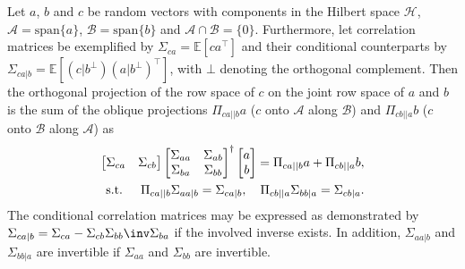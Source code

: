 \begin{lem}\label{lem:oblique_projections}\citep[Lemma~1]{Katayama1999} %
Let $a$, $b$ and $c$ be random vectors with components in the Hilbert space $\mathscr{H}$, $\mathscr{A}=\text{span}\{a\}$, $\mathscr{B}=\text{span}\{b\}$ and $\mathscr{A}\cap\mathscr{B}=\{0\}$. Furthermore, let correlation matrices be exemplified by $\Sigma_{ca}=\mathbb{E}[ca^\top]$ and their conditional counterparts by $\Sigma_{ca|b}=\mathbb{E}[(c|b^\bot)(a|b^\bot)^\top]$, with $\bot$ denoting the orthogonal complement. Then the orthogonal projection of the row space of $c$ on the joint row space of $a$ and $b$ is the sum of the oblique projections $\Pi_{ca||b}a$ ($c$ onto $\mathscr{A}$ along $\mathscr{B}$) and $\Pi_{cb||a}b$ ($c$ onto $\mathscr{B}$ along $\mathscr{A}$) as
\begin{align}
    \begin{bmatrix}
        \Sigma_{ca} & \Sigma_{cb}
    \end{bmatrix}
    \begin{bmatrix}
        \Sigma_{aa} & \Sigma_{ab}\\ \Sigma_{ba} & \Sigma_{bb}
    \end{bmatrix}^\dagger
    \begin{bmatrix}
        a \\ b
    \end{bmatrix} = \Pi_{ca||b} a + \Pi_{cb||a} b,\label{eq:oblique_project}\\
    \text{s.t. }\quad\Pi_{ca||b}\Sigma_{aa|b} = \Sigma_{ca|b},\quad \Pi_{cb||a}\Sigma_{bb|a} = \Sigma_{cb|a}.\notag
\end{align}
The conditional correlation matrices may be expressed as demonstrated by $\Sigma_{ca|b}=\Sigma_{ca}-\Sigma_{cb}\Sigma_{bb}\inv\Sigma_{ba}$ if the involved inverse exists. In addition, $\Sigma_{aa|b}$ and $\Sigma_{bb|a}$ are invertible if $\Sigma_{aa}$ and $\Sigma_{bb}$ are invertible.
\end{lem}

